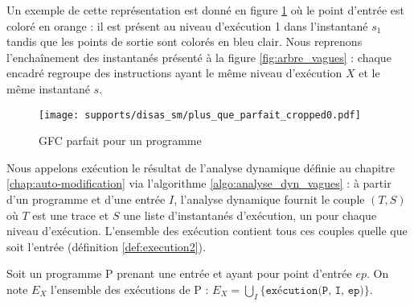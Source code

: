Un exemple de cette représentation est donné en figure \ref{fig:sm_cfg_parfait_sm} où le point d'entrée est coloré en orange : il est présent au niveau d'exécution 1 dans l'instantané $s_1$ tandis que les points de sortie sont colorés en bleu clair. Nous reprenons l'enchaînement des instantanés présenté à la figure \ref{fig:arbre_vagues} : chaque encadré regroupe des instructions ayant le même niveau d'exécution $X$ et le même instantané $s$.

\begin{figure}[h]
\begin{center}
  \texttt{[image: supports/disas\_sm/plus\_que\_parfait\_cropped0.pdf]}
\end{center}
\caption{GFC parfait pour un programme \sm}
\label{fig:sm_cfg_parfait_sm}
\end{figure}

Nous appelons exécution le résultat de l'analyse dynamique définie au chapitre \ref{chap:auto-modification} via l'algorithme \ref{algo:analyse_dyn_vagues} : à partir d'un programme et d'une entrée $I$, l'analyse dynamique fournit le couple $(T, S)$ où $T$ est une trace et $S$ une liste d'instantanés d'exécution, un pour chaque niveau d'exécution.
L'ensemble des exécution contient tous ces couples quelle que soit l'entrée (définition \ref{def:execution2}).


\begin{defi}
 Soit un programme P prenant une entrée et ayant pour point d'entrée $ep$.
 On note $E_X$ l'ensemble des exécutions de P : $E_X=\bigcup_I\{\texttt{exécution(P, I, ep)}\}$.
\label{def:execution2}
\end{defi}


